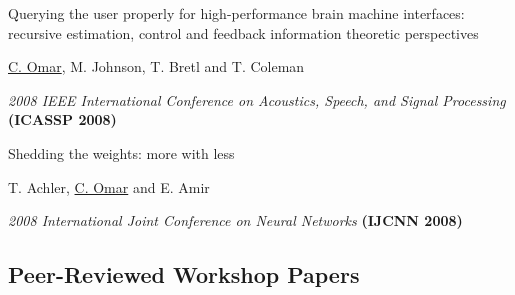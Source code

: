 \documentclass[10pt,letterpaper]{article}
\renewenvironment{itemize}{
  \begin{list}{}{
    \setlength{\leftmargin}{1.25em}
    \setlength{\itemsep}{0.25em}
    \setlength{\parskip}{0pt}
    \setlength{\parsep}{0.2em}
  }
}{
  \end{list}
}
\begin{document}
\begin{enumerate}
\item Querying the user properly for high-performance brain machine interfaces: recursive estimation, control and feedback information theoretic perspectives
  \begin{itemize}
    \item \underline{C. Omar}, M. Johnson, T. Bretl and T. Coleman
    \item \textit{2008 IEEE International Conference on Acoustics, Speech, and Signal Processing} {\textbf{(ICASSP 2008)}}
  \end{itemize}
\item Shedding the weights: more with less
  \begin{itemize}
    \item T. Achler, \underline{C. Omar} and E. Amir
    \item \textit{2008 International Joint Conference on Neural Networks} {\textbf{(IJCNN 2008)}}
  \end{itemize}

\end{enumerate}

\subsection*{Peer-Reviewed Workshop Papers}
\end{document}
